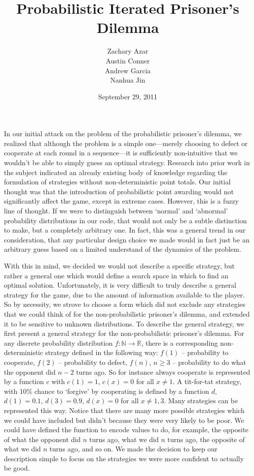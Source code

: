 \documentclass[11pt]{article}
\title{Probabilistic Iterated Prisoner's Dilemma}
\author{Zachary Azar\\Austin Conner\\Andrew Garcia\\ Nanhua Jin}
\date {September 29, 2011}
\begin{document}
\maketitle


In our initial attack on the problem of the probabilistic prisoner's dilemma, we realized that although the problem is a simple one---merely choosing to defect or cooperate at each round in a sequence---it is sufficiently non-intuitive that we wouldn’t be able to simply guess an optimal strategy. Research into prior work in the subject indicated an already existing body of knowledge regarding the formulation of strategies without non-deterministic point totals. Our initial thought was that the introduction of probabilistic point awarding would not significantly affect the game, except in extreme cases. However, this is a fuzzy line of thought. If we were to distinguish between ‘normal’ and ‘abnormal’ probability distributions in our code, that would not only be a subtle distinction to make, but a completely arbitrary one. In fact, this was a general trend in our consideration, that any particular design choice we made would in fact just be an arbitrary guess based on a limited understand of the dynamics of the problem. 


With this in mind, we decided we would not describe a specific strategy, but rather a general one which would define a search space in which to find an optimal solution. Unfortunately, it is very difficult to truly describe a general strategy for the game, due to the amount of information available to the player. So by necessity, we strove to choose a form which did not exclude any strategies that we could think of for the non-probabilistic prisoner's dilemma, and extended it to be sensitive to unknown distributions. To describe the general strategy, we first present a general strategy for the non-probabilistic prisoner's dilemma. For any discrete probability distribution $f :\mathbb{N} \to \mathbb{R}$, there is a corresponding non-deterministic strategy defined in the following way: $f(1)$ -- probability to cooperate, $f(2)$ -- probability to defect, $f(n)$, $n \ge 3$ -- probability to do what the opponent did $n-2$ turns ago. So for instance always cooperate is represented by a function $c$ with $c(1)=1$, $c(x)=0$ for all $x \ne 1$. A tit-for-tat strategy, with 10\% chance to ‘forgive’ by cooperating is defined by a function $d$, $d(1)=0.1$, $d(3)=0.9$, $d(x)=0$ for all $x \ne 1, 3$. Many strategies can be represented this way. Notice that there are many more possible strategies which we could have included but didn’t because they were very likely to be poor. We could have defined the function to encode values to do, for example, the opposite of what the opponent did $n$ turns ago, what we did $n$ turns ago, the opposite of what we did $n$ turns ago, and so on. We made the decision to keep our description simple to focus on the strategies we were more confident to actually be good. 
\end{document}
